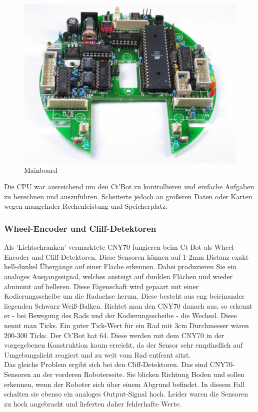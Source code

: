 \documentclass[twoside,12pt,a4paper]{report}
\begin{document}
	\begin{figure}[!htb]
		\centering
		\includegraphics[scale=0.1]{images/mainboard.jpg}
		\caption{Mainboard}
	\end{figure}
	
	Die CPU war ausreichend um den Ct'Bot zu kontrollieren und einfache Aufgaben zu berechnen und auszuführen. Scheiterte jedoch an größeren Daten oder Karten wegen mangelnder Rechenleistung und Speicherplatz. 
	
	\subsubsection{Wheel-Encoder und Cliff-Detektoren}
	Als 'Lichtschranken' vermarktete CNY70 fungieren beim Ct-Bot als Wheel-Encoder und Cliff-Detektoren. Diese Sensoren können auf 1-2mm Distanz exakt hell-dunkel Übergänge auf einer Fläche erkennen. Dabei produzieren Sie ein analoges Ausgangssignal, welches ansteigt auf dunklen Flächen und wieder abnimmt auf helleren. Diese Eigenschaft wird gepaart mit einer Kodierungsscheibe um die Radachse herum. Diese besteht aus eng beieinander liegenden Schwarz-Weiß-Balken. Richtet man den CNY70 danach aus, so erkennt er - bei Bewegung des Rads und der Kodierungsscheibe - die Wechsel. Diese nennt man Ticks. Ein guter Tick-Wert für ein Rad mit 3cm Durchmesser wären 200-300 Ticks. Der Ct'Bot hat 64. Diese werden mit dem CNY70 in der vorgegebenen Konstruktion kaum erreicht, da der Sensor sehr empfindlich auf Umgebungslicht reagiert und zu weit vom Rad entfernt sitzt. \\
	Das gleiche Problem ergibt sich bei den Cliff-Detektoren. Das sind CNY70-Sensoren an der vorderen Roboterseite. Sie blicken Richtung Boden und sollen erkennen, wenn der Roboter sich über einem Abgrund befindet. In diesem Fall schalten sie ebenso ein analoges Output-Signal hoch. Leider waren die Sensoren zu hoch angebracht und lieferten daher fehlerhafte Werte. 
	
\end{document}

